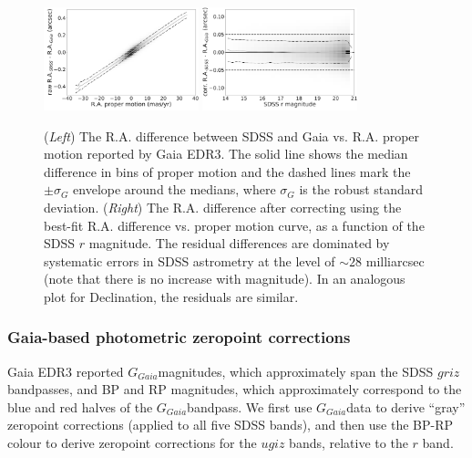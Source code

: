 \documentclass[fleqn,usenatbib]{mnras}
\newcommand{\GG}{\hbox{$G_{Gaia}$}}
\begin{document}
\begin{figure}
\centering \includegraphics[width=0.4\textwidth, keepaspectratio]{figures/astroVSpm_RA_pm_lr.png}
\centering \includegraphics[width=0.4\textwidth, keepaspectratio]{figures/astroVSpm_RA_r_lr.png}

\caption{({\it Left}) The R.A. difference between SDSS and Gaia 
vs. R.A. proper motion reported by Gaia EDR3. The solid line shows the median difference in bins 
of proper motion and the dashed lines mark the $\pm \sigma_G$ envelope around the medians,
where $\sigma_G$ is the robust standard deviation. ({\it Right}) The R.A. difference 
after correcting using the best-fit R.A. difference vs. 
proper motion curve, as a function of the SDSS $r$ magnitude. The residual differences are dominated 
by systematic errors in SDSS astrometry at the level of $\sim28$ milliarcsec (note that there is no increase with 
magnitude). In an analogous plot for Declination, the residuals are similar. 
\label{fig:GaiaRApm}}
\end{figure}


\subsubsection{Gaia-based photometric zeropoint corrections  \label{sec:GaiaCorr2}}

Gaia EDR3 reported \GG magnitudes, which approximately span the SDSS $griz$ bandpasses, 
and BP and RP magnitudes, which approximately correspond to the blue and red halves of the 
\GG bandpass. We first use \GG data to derive ``gray'' zeropoint corrections (applied to
all five SDSS bands), and then use the BP-RP colour to derive zeropoint corrections for the 
$ugiz$ bands, relative to the $r$ band. 
\end{document}
